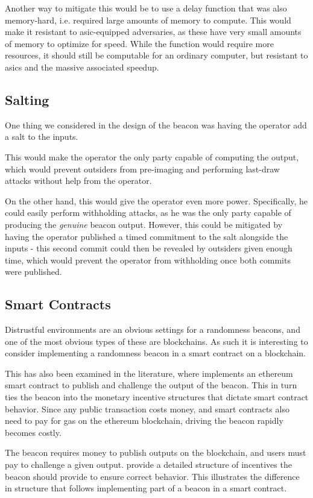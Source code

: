 Another way to mitigate this would be to use a delay function that was also memory-hard, i.e. required large amounts of memory to compute. This would make it resistant to \acrshort{asic}-equipped adversaries, as these have very small amounts of memory to optimize for speed. While the function would require more resources, it should still be computable for an ordinary computer, but resistant to \acrshort{asic}s and the massive associated speedup.

\subsection{Salting}

One thing we considered in the design of the beacon was having the operator add a salt to the inputs.

This would make the operator the only party capable of computing the output, which would prevent outsiders from pre-imaging and performing last-draw attacks without help from the operator.

On the other hand, this would give the operator even more power. Specifically, he could easily perform withholding attacks, as he was the only party capable of producing the \textit{genuine} beacon output. However, this could be mitigated by having the operator published a timed commitment to the salt alongside the inputs - this second commit could then be revealed by outsiders given enough time, which would prevent the operator from withholding once both commits were published.

\subsection{Smart Contracts}
Distrustful environments are an obvious settings for a randomness beacons, and one of the most obvious types of these are blockchains. As such it is interesting to consider implementing a randomness beacon in a smart contract on a blockchain.

This has also been examined in the literature, where \citet{bunz2017proofsof} implements an ethereum smart contract to publish and challenge the output of the beacon. This in turn ties the beacon into the monetary incentive structures that dictate smart contract behavior. Since any public transaction costs money, and smart contracts also need to pay for gas on the ethereum blockchain, driving the beacon rapidly becomes costly.

The beacon requires money to publish outputs on the blockchain, and users must pay to challenge a given output. \citet{bunz2017proofsof} provide a detailed structure of incentives the beacon should provide to ensure correct behavior. This illustrates the difference in structure that follows implementing part of a beacon in a smart contract.

